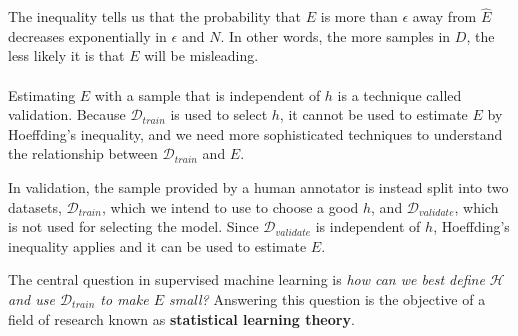 The inequality tells us that the probability that $E$ is more than $\epsilon$ away from $\hat{E}$ decreases exponentially in $\epsilon$ and $N$. In other words, the more samples in $D$, the less likely it is that $E$ will be misleading.
\\\\
Estimating $E$ with a sample that is independent of $h$ is a technique called validation. Because $\mathcal{D}_{train}$ is used to select $h$, it cannot be used to estimate $E$ by Hoeffding's inequality, and we need more sophisticated techniques to understand the relationship between $\mathcal{D}_{train}$ and $E$.

In validation, the sample provided by a human annotator is instead split into two datasets, $\mathcal{D}_{train}$, which we intend to use to choose a good $h$, and $\mathcal{D}_{validate}$, which is not used for selecting the model. Since $\mathcal{D}_{validate}$ is independent of $h$, Hoeffding's inequality applies and it can be used to estimate $E$.

The central question in supervised machine learning is \textit{how can we best define $\mathcal{H}$ and use $\mathcal{D}_{train}$ to make $E$ small?} Answering this question is the objective of a field of research known as \textbf{statistical learning theory}.

